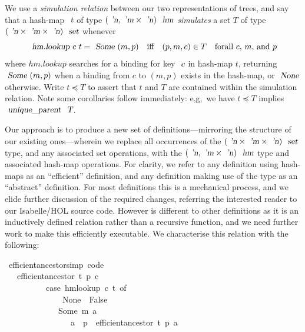 \documentclass[sigconf]{acmart}
\renewenvironment{isabelle}{%
  \medbreak\noindent%
  \renewcommand{\isanewline}{\\}%
  \begin{minipage}{\columnwidth}%
  \begin{isabellebody}%
  \begin{tabbing}%
}{%
  \end{tabbing}%
  \end{isabellebody}%
  \end{minipage}%
  \medbreak%
}
\renewcommand{\isacartoucheopen}{}
\renewcommand{\isacartoucheclose}{}
\begin{document}
We use a \emph{simulation relation} between our two representations of trees, and say that a hash-map $\isa{t}$ of type $(\isa{'n}, \isa{'m} \times \isa{'n})\ \isa{hm}$ \emph{simulates} a set $T$ of type $(\isa{'n} \times \isa{'m} \times \isa{'n})\ \isa{set}$ whenever
\begin{displaymath}
\isa{hm.lookup}\ c\ t = \isa{Some}\ (m, p) \quad\text{iff}\quad (p, m, c) \in T \quad\text{forall $c$, $m$, and $p$}
\end{displaymath}
where $hm.lookup$ searches for a binding for key $\isa{c}$ in hash-map $t$, returning $\isa{Some}\ (m, p)$ when a binding from $c$ to $(m, p)$ exists in the hash-map, or $\isa{None}$ otherwise.
Write $t \preceq T$ to assert that $t$ and $T$ are contained within the simulation relation.
Note some corollaries follow immediately: e,g,~we have $t \preceq T$ implies $\isa{unique\_parent}\ \isa{T}$.

Our approach is to produce a new set of definitions---mirroring the structure of our existing ones---wherein we replace all occurrences of the $(\isa{'n} \times \isa{'m} \times \isa{'n})\ \isa{set}$ type, and any associated set operations, with the $(\isa{'n}, \isa{'m} \times \isa{'n})\ \isa{hm}$ type and associated hash-map operations.
For clarity, we refer to any definition using hash-maps as an ``efficient'' definition, and any definition making use of the  type as an ``abstract'' definition.
For most definitions this is a mechanical process, and we elide further discussion of the required changes, referring the interested reader to our Isabelle/HOL source code.
However  is different to other definitions as it is an inductively defined relation rather than a recursive function, and we need further work to make this efficiently executable.
We characterise this relation with the following:

\begin{isabelle}
\isamarkupfalse%
\ efficient{\isacharunderscore}ancestor{\isacharunderscore}simp\ {\isacharbrackleft}code{\isacharbrackright}{\isacharcolon}\isanewline
\ \ \ {\isacartoucheopen}efficient{\isacharunderscore}ancestor\ t\ p\ c\ {\isasymlongleftrightarrow}\isanewline
\ \ \ \ \ \ \ \ \ \ {\isacharparenleft}case\ hm{\isachardot}lookup\ c\ t\ of\isanewline
\ \ \ \ \ \ \ \ \ \ \ \ \ \ None\ {\isasymRightarrow}\ False\isanewline
\ \ \ \ \ \ \ \ \ \ \ \ {\isacharbar}\ Some\ {\isacharparenleft}m{\isacharcomma}\ a{\isacharparenright}\ {\isasymRightarrow}\isanewline
\ \ \ \ \ \ \ \ \ \ \ \ \ \ \ \ a\ {\isacharequal}\ p\ {\isasymor}\ efficient{\isacharunderscore}ancestor\ t\ p\ a{\isacharparenright}{\isacartoucheclose}
\end{isabelle}
\end{document}
